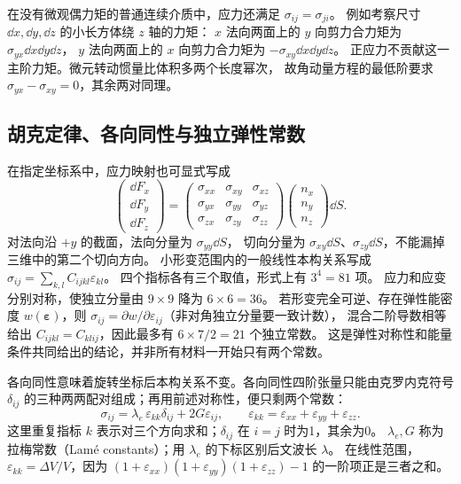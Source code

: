在没有微观偶力矩的普通连续介质中，应力还满足 $\sigma_{ij}=\sigma_{ji}$。
例如考察尺寸 $\dd x,\dd y,\dd z$ 的小长方体绕 $z$ 轴的力矩：
$x$ 法向两面上的 $y$ 向剪力合力矩为 $\sigma_{yx}\dd x\dd y\dd z$，
$y$ 法向两面上的 $x$ 向剪力合力矩为 $-\sigma_{xy}\dd x\dd y\dd z$。
正应力不贡献这一主阶力矩。微元转动惯量比体积多两个长度幂次，
故角动量方程的最低阶要求 $\sigma_{yx}-\sigma_{xy}=0$，其余两对同理。

\subsection{胡克定律、各向同性与独立弹性常数}

在指定坐标系中，应力映射也可显式写成
\[
 \begin{pmatrix}\dd F_x\\\dd F_y\\\dd F_z\end{pmatrix}
 =
 \begin{pmatrix}
 \sigma_{xx}&\sigma_{xy}&\sigma_{xz}\\
 \sigma_{yx}&\sigma_{yy}&\sigma_{yz}\\
 \sigma_{zx}&\sigma_{zy}&\sigma_{zz}
 \end{pmatrix}
 \begin{pmatrix}n_x\\n_y\\n_z\end{pmatrix}\dd S.
\]
对法向沿 $+y$ 的截面，法向分量为 $\sigma_{yy}\dd S$，
切向分量为 $\sigma_{xy}\dd S$、$\sigma_{zy}\dd S$，不能漏掉三维中的第二个切向方向。
小形变范围内的一般线性本构关系写成
$\sigma_{ij}=\sum_{k,l}C_{ijkl}\varepsilon_{kl}$。
四个指标各有三个取值，形式上有 $3^4=81$ 项。
应力和应变分别对称，使独立分量由 $9\times9$ 降为 $6\times6=36$。
若形变完全可逆、存在弹性能密度 $w(\boldsymbol\varepsilon)$，则
$\sigma_{ij}=\partial w/\partial\varepsilon_{ij}$（非对角独立分量要一致计数），
混合二阶导数相等给出 $C_{ijkl}=C_{klij}$，因此最多有 $6\times7/2=21$ 个独立常数。
这是弹性对称性和能量条件共同给出的结论，并非所有材料一开始只有两个常数。

各向同性意味着旋转坐标后本构关系不变。各向同性四阶张量只能由克罗内克符号
$\delta_{ij}$ 的三种两两配对组成；再用前述对称性，便只剩两个常数：
\begin{equation}
 \sigma_{ij}=\lambda_e\,\varepsilon_{kk}\delta_{ij}+2G\varepsilon_{ij},
 \qquad \varepsilon_{kk}=\varepsilon_{xx}+\varepsilon_{yy}+\varepsilon_{zz}.
 \label{ch12:eq:lame}
\end{equation}
这里重复指标 $k$ 表示对三个方向求和；$\delta_{ij}$ 在 $i=j$ 时为1，其余为0。
$\lambda_e,G$ 称为拉梅常数（Lamé constants）；用 $\lambda_e$ 的下标区别后文波长 $\lambda$。
在线性范围，$\varepsilon_{kk}=\Delta V/V$，因为
$(1+\varepsilon_{xx})(1+\varepsilon_{yy})(1+\varepsilon_{zz})-1$
的一阶项正是三者之和。


